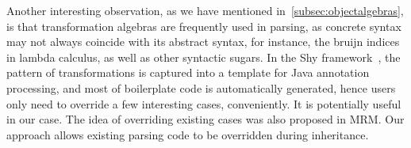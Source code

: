 \begin{comment}
Moreover, in~\cite{Oliveira2012} the authors have discussed the
composition of algebras. In our parsing approach, a parser consumes an
algebra, which is delegated to return the results, during its process
of parsing. Having a set of algebras, it requires multiple parsing
with several times of invocation, which leads to redundant work.
Instead, algebras are supposed to be composed into one before the
invocation of the parser. Bahr et al. lead a similar discussion
in~\cite{Bahr2011}, where queries (or \textit{catamorphisms}) and
transformations (or \textit{homomorphisms}) are composable. They have
also mentioned the dual process of folds, namely
\textit{anamorphisms}. It is potentially related to our work, as
parsing is a representative kind of unfolds, whereas they only
discussed the composition of a cv-coalgebra and a term homomorphism,
which differs from modular parsing.
\end{comment}

Another interesting observation, as we have mentioned
in~\ref{subsec:objectalgebras}, is that transformation algebras are
frequently used in parsing, as concrete syntax may not always coincide
with its abstract syntax, for instance, the bruijn indices in lambda
calculus, as well as other syntactic sugars. In the Shy
framework~\cite{Zhang2015}, the pattern of transformations is captured
into a template for Java annotation processing, and most of
boilerplate code is automatically generated, hence users only need to
override a few interesting cases, conveniently. It is potentially
useful in our case. The idea of overriding existing cases was also
proposed in MRM. Our approach allows existing parsing code to be
overridden during inheritance.
